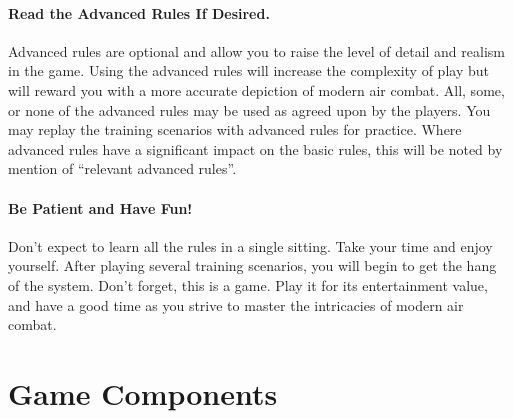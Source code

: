 {{\paragraph{Read the Advanced Rules If Desired.} Advanced rules are optional and allow you to raise the level of detail and realism in the game. Using the advanced rules will increase the complexity of play but will reward you with a more accurate depiction of modern air combat. All, some, or none of the advanced rules may be used as agreed upon by the players. You may replay the training scenarios with advanced rules for practice. Where advanced rules have a significant impact on the basic rules, this will be noted by mention of “relevant advanced rules”. 

\paragraph{Be Patient and Have Fun!} Don’t expect to learn all the rules in a single sitting. Take your time and enjoy yourself. After playing several training scenarios, you will begin to get the hang of the system. Don’t forget, this is a game. Play it for its entertainment value, and have a good time as you strive to master the intricacies of modern air combat.

}

}

\section{Game Components}

